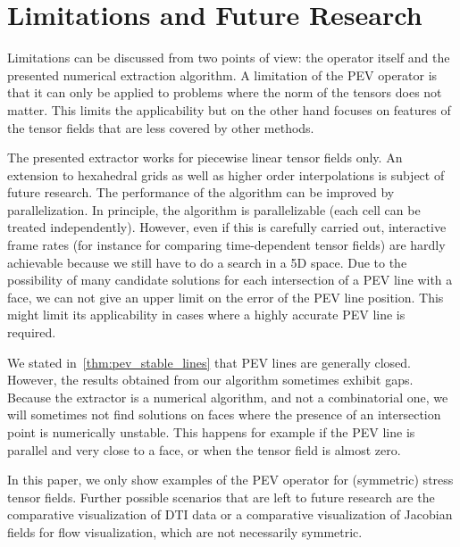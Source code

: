 
%
\section{Limitations and Future Research} %
\label{sec:pev_limitations}
% 
Limitations can be discussed from two points of view:
%
the operator itself and the presented numerical extraction algorithm.
%
A limitation of the \ac{PEV} operator is that it can only be applied to problems
where the norm of the tensors does not matter.
%
This limits the applicability but on the other hand focuses on features of the
tensor fields that are less covered by other methods.
%

%
The presented extractor works for piecewise linear tensor fields only.
%
An extension to hexahedral grids as well as higher order interpolations is
subject of future research.
%
The performance of the algorithm can be improved by parallelization.
%
In principle, the algorithm is parallelizable (each cell can be treated
independently).
%
However, even if this is carefully carried out, interactive frame rates (for
instance for comparing time-dependent tensor fields) are hardly achievable
because we still have to do a search in a \ac{5D} space.
%
Due to the possibility of many candidate solutions for each intersection of a
\ac{PEV} line with a face, we can not give an upper limit on the error of the
\ac{PEV} line position.
%
This might limit its applicability in cases where a highly accurate \ac{PEV} line is
required.
%

%
%
We stated in~\cref{thm:pev_stable_lines} that \ac{PEV} lines are generally closed.
%
However, the results obtained from our algorithm sometimes exhibit gaps.
%
Because the extractor is a numerical algorithm, and not a combinatorial one, we
will sometimes not find solutions on faces where the presence of an intersection
point is numerically unstable.
%
This happens for example if the \ac{PEV} line is parallel and very close to a face,
or when the tensor field is almost zero.
%
%

%
In this paper, we only show examples of the \ac{PEV} operator for (symmetric) stress
tensor fields.
%
Further possible scenarios that are left to future research are the comparative
visualization of \ac{DTI} data or a comparative visualization of Jacobian fields
for flow visualization, which are not necessarily symmetric.
%